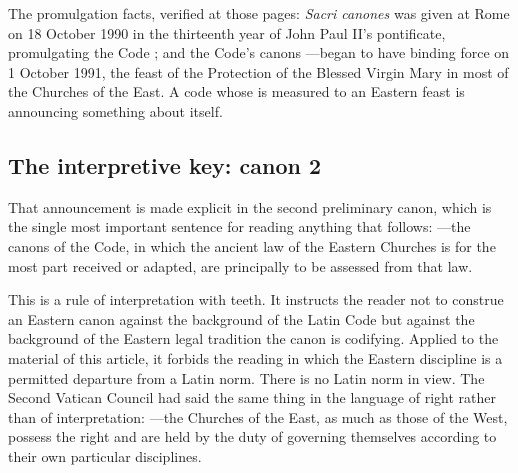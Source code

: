 The promulgation facts, verified at those pages: \emph{Sacri canones} was given at Rome on 18 October 1990 in the thirteenth year of John Paul II's pontificate, promulgating the Code ; and the Code's canons ---began to have binding force on 1 October 1991, the feast of the Protection of the Blessed Virgin Mary in most of the Churches of the East. A code whose  is measured to an Eastern feast is announcing something about itself.

\subsection{The interpretive key: canon 2}

That announcement is made explicit in the second preliminary canon, which is the single most important sentence for reading anything that follows: ---the canons of the Code, in which the ancient law of the Eastern Churches is for the most part received or adapted, are principally to be assessed from that law.

This is a rule of interpretation with teeth. It instructs the reader not to construe an Eastern canon against the background of the Latin Code but against the background of the Eastern legal tradition the canon is codifying. Applied to the material of this article, it forbids the reading in which the Eastern discipline is a permitted departure from a Latin norm. There is no Latin norm in view. The Second Vatican Council had said the same thing in the language of right rather than of interpretation: ---the Churches of the East, as much as those of the West, possess the right and are held by the duty of governing themselves according to their own particular disciplines.


